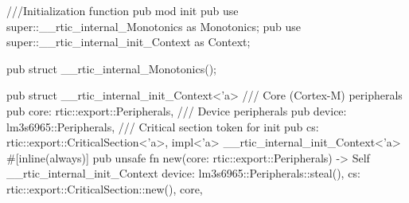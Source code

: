 ///Initialization function
pub mod init {
    pub use super::__rtic_internal_Monotonics as Monotonics;
    pub use super::__rtic_internal_init_Context as Context;
}

pub struct __rtic_internal_Monotonics();

pub struct __rtic_internal_init_Context<'a> {
    /// Core (Cortex-M) peripherals
    pub core: rtic::export::Peripherals,
    /// Device peripherals
    pub device: lm3s6965::Peripherals,
    /// Critical section token for init
    pub cs: rtic::export::CriticalSection<'a>,
}
impl<'a> __rtic_internal_init_Context<'a> {
    #[inline(always)]
    pub unsafe fn new(core: rtic::export::Peripherals) -> Self {
        __rtic_internal_init_Context {
            device: lm3s6965::Peripherals::steal(),
            cs: rtic::export::CriticalSection::new(),
            core,
        }
    }
}